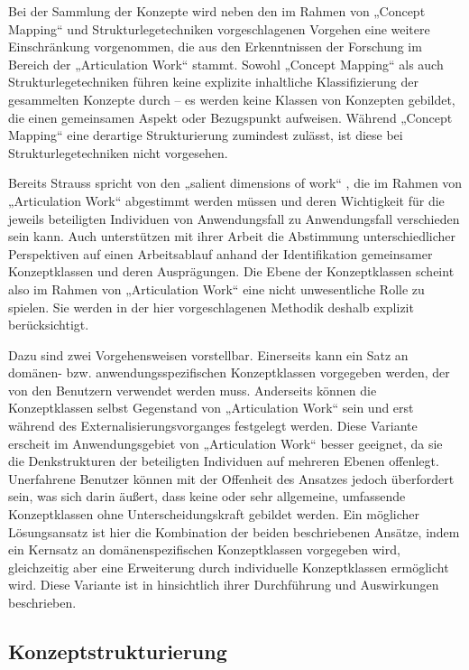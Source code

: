 Bei der Sammlung der Konzepte wird neben den im Rahmen von „Concept Mapping“ und Strukturlegetechniken vorgeschlagenen Vorgehen eine weitere Einschränkung vorgenommen, die aus den Erkenntnissen der Forschung im Bereich der „Articulation Work“ stammt. Sowohl „Concept Mapping“ als auch Strukturlegetechniken führen keine explizite inhaltliche Klassifizierung der gesammelten Konzepte durch -- es werden keine Klassen von Konzepten gebildet, die einen gemeinsamen Aspekt oder Bezugspunkt aufweisen. Während „Concept Mapping“ eine derartige Strukturierung zumindest zulässt, ist diese bei Strukturlegetechniken nicht vorgesehen.

Bereits Strauss spricht von den „salient dimensions of work“ \citep[][S.5]{Fjuk97}, die im Rahmen von „Articulation Work“ abgestimmt werden müssen und deren Wichtigkeit für die jeweils beteiligten Individuen von Anwendungsfall zu Anwendungsfall verschieden sein kann. Auch \citet{Sarini02} unterstützen mit ihrer Arbeit die Abstimmung unterschiedlicher Perspektiven auf einen Arbeitsablauf anhand der Identifikation gemeinsamer Konzeptklassen und deren Ausprägungen. Die Ebene der Konzeptklassen scheint also im Rahmen von „Articulation Work“ eine nicht unwesentliche Rolle zu spielen. Sie werden in der hier vorgeschlagenen Methodik deshalb explizit berücksichtigt. 

Dazu sind zwei Vorgehensweisen vorstellbar. Einerseits kann ein Satz an domänen- bzw. anwendungsspezifischen Konzeptklassen vorgegeben werden, der von den Benutzern verwendet werden muss. Anderseits können die Konzeptklassen selbst Gegenstand von „Articulation Work“ sein und erst während des Externalisierungsvorganges festgelegt werden. Diese Variante erscheit im Anwendungsgebiet von „Articulation Work“ besser geeignet, da sie die Denkstrukturen der beteiligten Individuen auf mehreren Ebenen offenlegt. Unerfahrene Benutzer können mit der Offenheit des Ansatzes jedoch überfordert sein, was sich darin äußert, dass keine oder sehr allgemeine, umfassende Konzeptklassen ohne Unterscheidungskraft gebildet werden. Ein möglicher Lösungsansatz ist hier die Kombination der beiden beschriebenen Ansätze, indem ein Kernsatz an domänenspezifischen Konzeptklassen vorgegeben wird, gleichzeitig aber eine Erweiterung durch individuelle Konzeptklassen ermöglicht wird. Diese Variante ist in \citet{Oppl05} hinsichtlich ihrer Durchführung und Auswirkungen beschrieben. 

\subsection{Konzeptstrukturierung}

